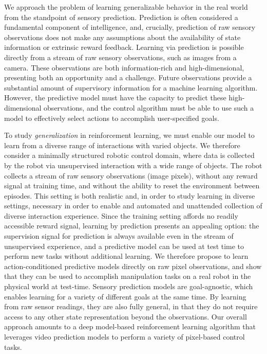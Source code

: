 We approach the problem of learning generalizable behavior in the real world from the standpoint of sensory prediction. Prediction is often considered a fundamental component of intelligence, and, crucially, prediction of raw sensory observations does not make any assumptions about the availability of state information or extrinsic reward feedback. Learning via prediction is possible directly from a stream of raw sensory observations, such as images from a camera. These observations are both information-rich and high-dimensional, presenting both an opportunity and a challenge. Future observations provide a substantial amount of supervisory information for a machine learning algorithm. However, the predictive model must have the capacity to predict these high-dimensional observations, and the control algorithm must be able to use such a model to effectively select actions to accomplish user-specified goals.



To study \emph{generalization} in reinforcement learning, we must enable our model to learn from a diverse range of interactions with varied objects. We therefore consider a minimally structured robotic control domain, where data is collected by the robot via unsupervised interaction with a wide range of objects. The robot collects a stream of raw sensory observations (image pixels), without any reward signal at training time, and without the ability to reset the environment between episodes. This setting is both realistic and, in order to study learning in diverse settings, necessary in order to enable and automated and unattended collection of diverse interaction experience. Since the training setting affords no readily accessible reward signal, learning by prediction presents an appealing option: the supervision signal for prediction is always available even in the stream of unsupervised experience, and a predictive model can be used at test time to perform new tasks without additional learning.
We therefore propose to learn action-conditioned predictive models directly on raw pixel observations, and show that they can be used to accomplish manipulation tasks on a real robot in the physical world at test-time.
Sensory prediction models are goal-agnostic, which enables learning for a variety of different goals at the same time. By learning from raw sensor readings, they are also fully general, in that they do not require access to any other state representation beyond the observations.
Our overall approach amounts to a deep model-based reinforcement learning algorithm that leverages video prediction models to perform a variety of pixel-based control tasks.

